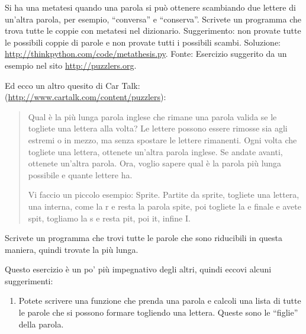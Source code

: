 \documentclass[10pt]{book}
\begin{document}
\vspace{0.2in}
\begin{exercise}

Si ha una metatesi quando una parola si può ottenere scambiando due lettere di un'altra parola, per esempio, ``conversa'' e ``conserva''.  Scrivete un programma che trova tutte le coppie con metatesi nel dizionario. Suggerimento: non provate tutte le possibili coppie di parole e non provate tutti i possibili scambi. Soluzione: \url{http://thinkpython.com/code/metathesis.py}.
Fonte: Esercizio suggerito da un esempio nel sito \url{http://puzzlers.org}.

\end{exercise}


\vspace{0.2in}
\begin{exercise}

Ed ecco un altro quesito di Car Talk:
(\url{http://www.cartalk.com/content/puzzlers}):

\begin{quote}
Qual è la più lunga parola inglese che rimane una parola valida se le togliete una lettera alla volta? 
Le lettere possono essere rimosse sia agli estremi o in mezzo, ma senza spostare le lettere rimanenti. Ogni volta che togliete una lettera, ottenete un'altra parola inglese. Se andate avanti, ottenete un'altra parola. Ora, voglio sapere qual è la parola più lunga possibile e quante lettere ha.

Vi faccio un piccolo esempio: Sprite. Partite da sprite, togliete una lettera, una interna, come la r e resta la parola spite, poi togliete la e finale e avete spit, togliamo la s e resta pit, poi it, infine I.
\end{quote}

Scrivete un programma che trovi tutte le parole che sono riducibili in questa maniera, quindi trovate la più lunga.

Questo esercizio è un po' più impegnativo degli altri, quindi eccovi alcuni suggerimenti:

\begin{enumerate}

\item Potete scrivere una funzione che prenda una parola e calcoli una lista di tutte le parole che si possono formare togliendo una lettera. Queste sono le ``figlie'' della parola.


\end{enumerate}
\end{exercise}
\end{document}
